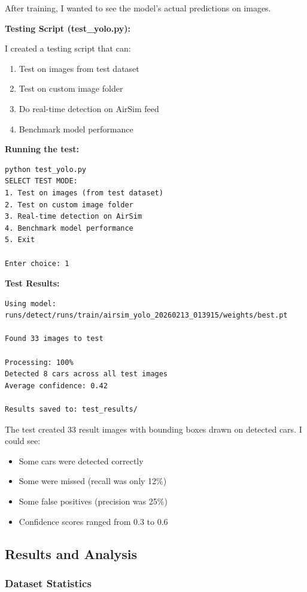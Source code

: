 After training, I wanted to see the model's actual predictions on images.

\textbf{Testing Script (test\_yolo.py):}

I created a testing script that can:
\begin{enumerate}
	\item Test on images from test dataset
	\item Test on custom image folder
	\item Do real-time detection on AirSim feed
	\item Benchmark model performance
\end{enumerate}

\textbf{Running the test:}
\begin{verbatim}
python test_yolo.py
SELECT TEST MODE:
1. Test on images (from test dataset)
2. Test on custom image folder
3. Real-time detection on AirSim
4. Benchmark model performance
5. Exit

Enter choice: 1
\end{verbatim}

\textbf{Test Results:}
\begin{verbatim}
Using model: runs/detect/runs/train/airsim_yolo_20260213_013915/weights/best.pt

Found 33 images to test

Processing: 100%
Detected 8 cars across all test images
Average confidence: 0.42

Results saved to: test_results/
\end{verbatim}

The test created 33 result images with bounding boxes drawn on detected cars. I could see:
\begin{itemize}
	\item Some cars were detected correctly
	\item Some were missed (recall was only 12\%)
	\item Some false positives (precision was 25\%)
	\item Confidence scores ranged from 0.3 to 0.6
\end{itemize}

\subsection{Results and Analysis}

\subsubsection{Dataset Statistics}


